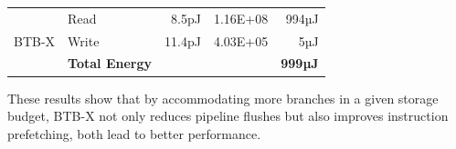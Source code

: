 \begin{small}
\begin{table}[t!]
\begin{tabular}{llrrr}
            \multirow{3}{*}{BTB-X} & \multicolumn{1}{l}{Read} & \multicolumn{1}{r}{8.5pJ} & \multicolumn{1}{r}{1.16E+08} & \multicolumn{1}{r}{994µJ}\\\cline{2-5}
                                 & \multicolumn{1}{l}{Write} & \multicolumn{1}{r}{11.4pJ} & \multicolumn{1}{r}{4.03E+05} & \multicolumn{1}{r}{5µJ}\\\cline{2-5}
                                 & \multicolumn{1}{l}{\textbf{Total Energy}} & \multicolumn{1}{r}{} & \multicolumn{1}{r}{} & \multicolumn{1}{r}{\textbf{999µJ}}\\\hline

        \end{tabular}
\end{table}
\end{small}


These results show that by accommodating more branches in a given storage budget, BTB-X not only reduces pipeline flushes but also improves instruction prefetching, both lead to better performance.

